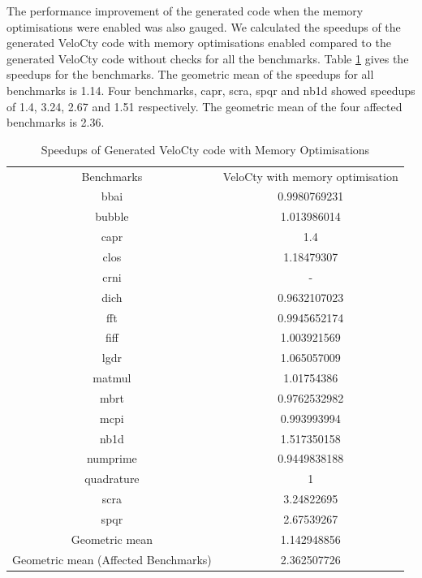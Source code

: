 The performance improvement of the generated code when the memory optimisations were enabled was also gauged. We calculated the speedups of the generated VeloCty code with memory optimisations enabled compared to the generated VeloCty code without checks for all the benchmarks. Table \ref{tab:cmvscwo} gives the speedups for the benchmarks. The geometric mean of the speedups for all benchmarks is 1.14. Four benchmarks, capr, scra, spqr and nb1d showed speedups of 1.4, 3.24, 2.67 and 1.51 respectively. The geometric mean of the four affected benchmarks is 2.36. 
\begin{table}[htbp]
\centering
\begin{tabular}{|c|c|}
\hline
Benchmarks                           & VeloCty with memory optimisation \\ \hhline{|=|=|}
bbai                                 & 0.9980769231               \\ \hline
bubble                               & 1.013986014                \\ \hline
capr                                 & 1.4                        \\ \hline
clos                                 & 1.18479307                 \\ \hline
crni                                 & -                          \\ \hline
dich                                 & 0.9632107023               \\ \hline
fft                                  & 0.9945652174               \\ \hline
fiff                                 & 1.003921569                \\ \hline
lgdr                                 & 1.065057009                \\ \hline
matmul                               & 1.01754386                 \\ \hline
mbrt                                 & 0.9762532982               \\ \hline
mcpi                                 & 0.993993994                \\ \hline
nb1d                                 & 1.517350158                \\ \hline
numprime                             & 0.9449838188               \\ \hline
quadrature                           & 1                          \\ \hline
scra                                 & 3.24822695                 \\ \hline
spqr                                 & 2.67539267                 \\ \hline
Geometric mean                       & 1.142948856                \\ \hline
Geometric mean (Affected Benchmarks) & 2.362507726                \\ \hline
\end{tabular}
\caption{Speedups of Generated VeloCty code with Memory Optimisations}
\label{tab:cmvscwo}
\end{table}


